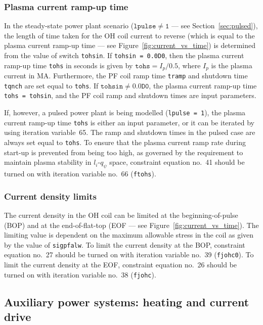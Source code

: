 \documentclass[11pt,a4paper]{report}
\begin{document}
\subsubsection{Plasma current ramp-up time}
\label{sec:tohs}

In the steady-state power plant scenario ($\mathtt{lpulse \not= 1}$ --- see
Section~\ref{sec:pulsed}), the length of time taken for the OH coil current to
reverse (which is equal to the plasma current ramp-up time --- see
Figure~\ref{fig:current_vs_time}) is determined from the value of switch
\texttt{tohsin}. If \texttt{tohsin = 0.0D0}, then the plasma current ramp-up
time \texttt{tohs} in seconds is given by $\mathtt{tohs} = I_p / 0.5$, where
$I_p$ is the plasma current in MA\@. Furthermore, the PF coil ramp time
\texttt{tramp} and shutdown time \texttt{tqnch} are set equal to
\texttt{tohs}.  If $\mathtt{tohsin \not= 0.0D0}$, the plasma current ramp-up
time \texttt{tohs = tohsin}, and the PF coil ramp and shutdown times are input
parameters.

If, however, a pulsed power plant is being modelled (\texttt{lpulse = 1}), the
plasma current ramp-up time \texttt{tohs} is either an input parameter, or it can be
iterated by using iteration variable~65. The ramp and shutdown times in the
pulsed case are always set equal to \texttt{tohs}. To ensure that the plasma
current ramp rate during start-up is prevented from being too high, as
governed by the requirement to maintain plasma stability in $l_i$-$q_\psi$
space, constraint equation no.\ 41 should be turned on with iteration variable
no.\ 66 (\texttt{ftohs}).

\subsubsection{Current density limits}

The current density in the OH coil can be limited at the beginning-of-pulse
(BOP) and at the end-of-flat-top (EOF --- see
Figure~\ref{fig:current_vs_time}). The limiting value is dependent on the
maximum allowable stress in the coil as given by the value of
\texttt{sigpfalw}. To limit the current density at the BOP, constraint
equation no.\ 27 should be turned on with iteration variable no.\ 39
(\texttt{fjohc0}). To limit the current density at the EOF, constraint
equation no.\ 26 should be turned on with iteration variable no.\ 38
(\texttt{fjohc}).

\subsection{Auxiliary power systems: heating and current drive}
\label{sec:hcd}
\end{document}
